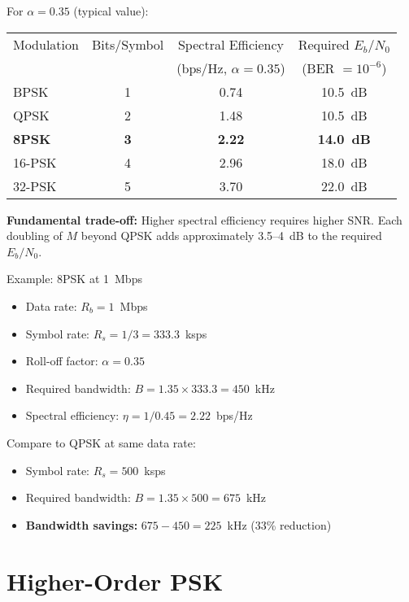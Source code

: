 For $\alpha = 0.35$ (typical value):

\begin{center}
\begin{tabular}{@{}lccc@{}}
\toprule
Modulation & Bits/Symbol & Spectral Efficiency & Required $E_b/N_0$ \\
& & (bps/Hz, $\alpha=0.35$) & (BER $= 10^{-6}$) \\
\midrule
BPSK & 1 & 0.74 & 10.5~dB \\
QPSK & 2 & 1.48 & 10.5~dB \\
\textbf{8PSK} & \textbf{3} & \textbf{2.22} & \textbf{14.0~dB} \\
16-PSK & 4 & 2.96 & 18.0~dB \\
32-PSK & 5 & 3.70 & 22.0~dB \\
\bottomrule
\end{tabular}
\end{center}

\textbf{Fundamental trade-off:} Higher spectral efficiency requires higher SNR. Each doubling of $M$ beyond QPSK adds approximately 3.5--4~dB to the required $E_b/N_0$.

\begin{calloutbox}{Example: 8PSK at 1~Mbps}
\begin{itemize}
\item Data rate: $R_b = 1$~Mbps
\item Symbol rate: $R_s = 1/3 = 333.3$~ksps
\item Roll-off factor: $\alpha = 0.35$
\item Required bandwidth: $B = 1.35 \times 333.3 = 450$~kHz
\item Spectral efficiency: $\eta = 1/0.45 = 2.22$~bps/Hz
\end{itemize}

Compare to QPSK at same data rate:
\begin{itemize}
\item Symbol rate: $R_s = 500$~ksps
\item Required bandwidth: $B = 1.35 \times 500 = 675$~kHz
\item \textbf{Bandwidth savings:} $675 - 450 = 225$~kHz (33\% reduction)
\end{itemize}
\end{calloutbox}

\section{Higher-Order PSK}

